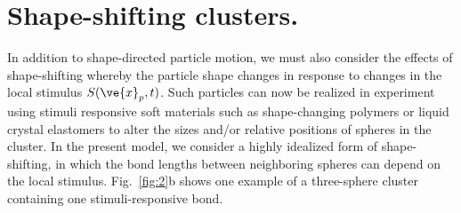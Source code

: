 \section{Shape-shifting clusters.}  
In addition to shape-directed particle motion, we must also consider the effects of shape-shifting whereby the particle shape changes in response to changes in the local stimulus $S(\ve{x}_p,t)$.  Such particles can now be realized in experiment using stimuli responsive soft materials such as shape-changing polymers \cite{magdanz2014stimuli} or liquid crystal elastomers \cite{palagi2016structured} to alter the sizes and/or relative positions of spheres in the cluster.  In the present model, we consider a highly idealized form of shape-shifting, in which the bond lengths between neighboring spheres can depend on the local stimulus.  Fig.\ \ref{fig:2}b shows one example of a three-sphere cluster containing one stimuli-responsive bond.

